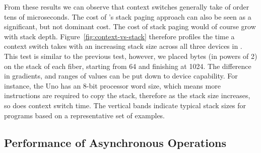 From these results we can observe that context switches generally take of order tens of microseconds. 
The cost of \CON's stack paging approach can also be seen as a significant, but not dominant cost. 
The cost of stack paging would of course grow with stack depth.
Figure~\ref{fig:context-vs-stack} therefore profiles the time a context switch takes with an increasing stack size across all three devices in \CO. 
This test is similar to the previous test, however, we placed bytes (in powers of 2) on the stack of each fiber, starting from 64 and finishing at 1024. 
The difference in gradients, and ranges of values can be put down to device capability. 
For instance, the Uno has an 8-bit processor word size, which means more instructions are required to copy the stack, therefore as the stack size increases, so does context switch time. 
The vertical bands indicate typical stack sizes for \MC programs based on a representative set of examples.


\subsection{Performance of Asynchronous Operations}

